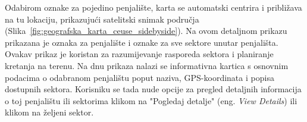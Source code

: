 Odabirom oznake za pojedino penjalište, karta se automatski centrira i približava na tu lokaciju, prikazujući satelitski snimak područja (Slika~\ref{fig:geografska_karta_ceuse_sidebyside}). Na ovom detaljnom prikazu prikazana je oznaka za penjalište i oznake za sve sektore unutar penjališta. Ovakav prikaz je koristan za razumijevanje rasporeda sektora i planiranje kretanja na terenu. Na dnu prikaza nalazi se informativna kartica s osnovnim podacima o odabranom penjalištu poput naziva, GPS-koordinata i popisa dostupnih sektora. Korisniku se tada nude opcije za pregled detaljnih informacija o toj penjalištu ili sektorima klikom na "Pogledaj detalje" (eng. \textit{View Details}) ili klikom na željeni sektor.
